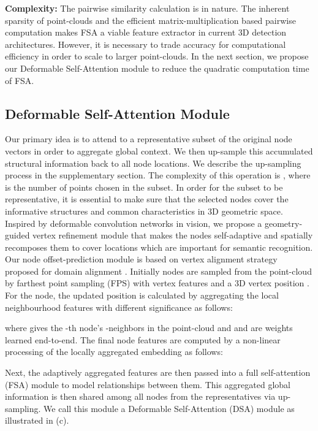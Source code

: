 \documentclass[10pt,twocolumn,letterpaper]{article}
\begin{document}
\textbf{Complexity:} The pairwise similarity calculation is  in nature. The inherent sparsity of point-clouds and the efficient matrix-multiplication based pairwise computation makes FSA a viable feature extractor in current 3D detection architectures. However, it is necessary to trade accuracy for computational efficiency in order to scale to larger point-clouds. In the next section, we propose our Deformable Self-Attention module to reduce the quadratic computation time of FSA.

\subsection{Deformable Self-Attention Module}
 Our primary idea is to attend to a representative subset of the original node vectors in order to aggregate global context. We then up-sample this accumulated structural information back to all node locations. We describe the up-sampling process in the supplementary section. The complexity of this operation is , where  is the number of points chosen in the subset. In order for the subset to be representative, it is essential to make sure that the selected nodes cover the informative structures and common characteristics in 3D geometric space. Inspired by deformable convolution networks \cite{DCN} in vision, we propose a geometry-guided vertex refinement module that makes the nodes self-adaptive and spatially recomposes them to cover locations which are important for semantic recognition. Our node offset-prediction module is based on vertex alignment strategy proposed for domain alignment \cite{Pointdan, meshrcnn}. Initially  nodes are sampled from the point-cloud by farthest point sampling (FPS) with vertex features  and a 3D vertex position . For the  node, the updated position  is calculated by aggregating the local neighbourhood features with different significance as follows:


where  gives the -th node's -neighbors in the point-cloud and  and  are weights learned end-to-end. The final node features are computed by a non-linear processing of the locally aggregated embedding as follows:

Next, the  adaptively aggregated features  are then passed into a full self-attention (FSA) module to model relationships between them.
This aggregated global information is then shared among all  nodes from the  representatives via up-sampling. We call this module a Deformable Self-Attention (DSA) module as illustrated in (c). 
\end{document}
